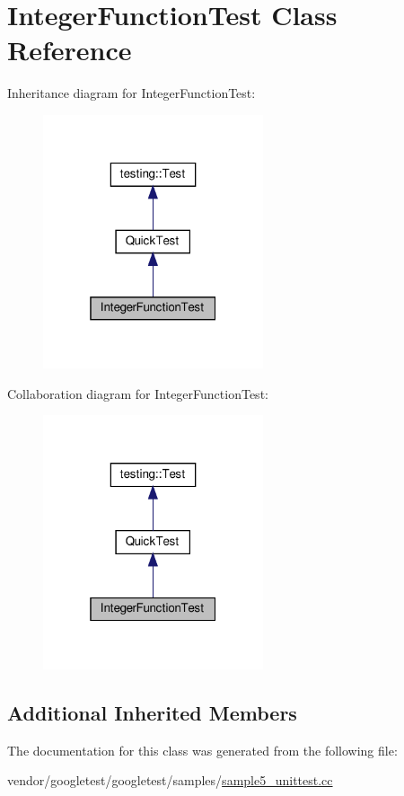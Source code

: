 \hypertarget{class_integer_function_test}{}\section{Integer\+Function\+Test Class Reference}
\label{class_integer_function_test}


Inheritance diagram for Integer\+Function\+Test\+:
\nopagebreak
\begin{figure}[H]
\begin{center}
\leavevmode
\includegraphics[width=184pt]{class_integer_function_test__inherit__graph}
\end{center}
\end{figure}


Collaboration diagram for Integer\+Function\+Test\+:
\nopagebreak
\begin{figure}[H]
\begin{center}
\leavevmode
\includegraphics[width=184pt]{class_integer_function_test__coll__graph}
\end{center}
\end{figure}
\subsection*{Additional Inherited Members}


The documentation for this class was generated from the following file\+:\begin{DoxyCompactItemize}
\item 
vendor/googletest/googletest/samples/\hyperlink{sample5__unittest_8cc}{sample5\+\_\+unittest.\+cc}\end{DoxyCompactItemize}
